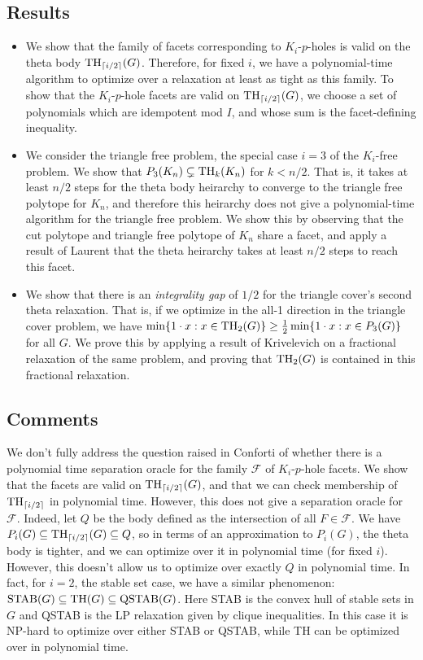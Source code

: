\subsection{Results}
\begin{itemize}
\item We show that the family of facets corresponding to $K_i$-$p$-holes is valid on
the theta body $\textup{TH}_{\lceil i/2\rceil }(G)$.
Therefore, for fixed $i$, we have a polynomial-time algorithm to optimize over a relaxation at least as tight as this family. 
To show that the $K_i$-$p$-hole facets are valid on $\textup{TH}_{\lceil i/2\rceil}(G)$, we choose a set of 
polynomials which are idempotent mod $I$, and whose sum is the facet-defining
inequality.
\item We consider the triangle free problem, the special case $i=3$ of the
$K_i$-free problem. We show that $P_3(K_n) \subsetneq \textup{TH}_{k}(K_n)$ for $k < n/2$.
That is, it takes at least $n/2$ steps for the theta body heirarchy to converge
to the triangle free polytope for $K_n$, and therefore this heirarchy does not give a polynomial-time algorithm for the triangle free problem.
We show this by observing that the cut polytope and triangle free polytope of $K_n$ share a facet, and apply a result of Laurent \cite{moniquestuff} that the theta heirarchy takes at least $n/2$ steps to reach this facet.
\item We show that there is an {\em integrality gap} of $1/2$ for the triangle cover's second theta relaxation. 
That is, if we optimize in the all-1 direction in the triangle cover problem, we have $\min \{1 \cdot x: x \in \textup{TH}_2(G) \} \ge \frac{1}{2} \min \{1 \cdot x: x \in P_3(G)\}$ for all $G$. 
We prove this by applying a result of Krivelevich \cite{krivelevich} on a fractional relaxation of the same problem, and proving that $\textup{TH}_2(G)$ is contained in this fractional relaxation.
\end{itemize}
\subsection{Comments}
We don't fully address the question raised in Conforti of whether there is a polynomial time separation oracle for the family $\mathcal{F}$ of $K_i$-$p$-hole facets.
We show that the facets are valid on $\textup{TH}_{\lceil i/2\rceil}(G)$, and that we can check membership of $\textup{TH}_{\lceil i/2 \rceil}$ in polynomial time. 
However, this does not give a separation oracle for $\mathcal{F}$.
Indeed, let $Q$ be the body defined as the intersection of all $F \in \mathcal{F}$.
We have $P_i(G) \subseteq \textup{TH}_{\lceil i/2\rceil}(G) \subseteq Q$, so in terms of an approximation to $P_i(G)$, the theta body is tighter, and we can optimize over it in polynomial time (for fixed $i$).
However, this doesn't allow us to optimize over exactly $Q$ in polynomial time.
In fact, for $i=2$, the stable set case, we have a similar phenomenon:
$\textup{STAB}(G) \subseteq \textup{TH}(G) \subseteq \textup{QSTAB}(G)$. Here STAB is the convex hull of stable sets in $G$ and QSTAB is the LP relaxation given by clique inequalities.
In this case it is NP-hard to optimize over either STAB or QSTAB, while TH can be optimized over in polynomial time.


